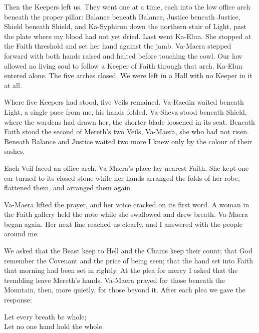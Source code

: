 Then the Keepers left us. They went one at a time, each into the low office arch beneath the proper pillar: Balance beneath Balance, Justice beneath Justice, Shield beneath Shield, and Ka-Syphiron down the northern stair of Light, past the plate where my blood had not yet dried. Last went Ka-Elun. She stopped at the Faith threshold and set her hand against the jamb. Va-Maera stepped forward with both hands raised and halted before touching the cowl. Our law allowed no living soul to follow a Keeper of Faith through that arch. Ka-Elun entered alone. The five arches closed. We were left in a Hall with no Keeper in it at all.\par

Where five Keepers had stood, five Veils remained. Va-Raedin waited beneath Light, a single pace from me, his hands folded. Va-Sheva stood beneath Shield, where the wardens had drawn her, the shorter blade loosened in its seat. Beneath Faith stood the second of Mereth's two Veils, Va-Maera, she who had not risen. Beneath Balance and Justice waited two more I knew only by the colour of their sashes.\par

Each Veil faced an office arch. Va-Maera's place lay nearest Faith. She kept one ear turned to its closed stone while her hands arranged the folds of her robe, flattened them, and arranged them again.\par

\ornament

Va-Maera lifted the prayer, and her voice cracked on its first word. A woman in the Faith gallery held the note while she swallowed and drew breath. Va-Maera began again. Her next line reached us clearly, and I answered with the people around me.\par

We asked that the Beast keep to Hell and the Chains keep their count; that God remember the Covenant and the price of being seen; that the hand set into Faith that morning had been set in rightly. At the plea for mercy I asked that the trembling leave Mereth's hands. Va-Maera prayed for those beneath the Mountain, then, more quietly, for those beyond it. After each plea we gave the response:\par

\begin{scripture}
Let every breath be whole;\\
Let no one hand hold the whole.
\end{scripture}

